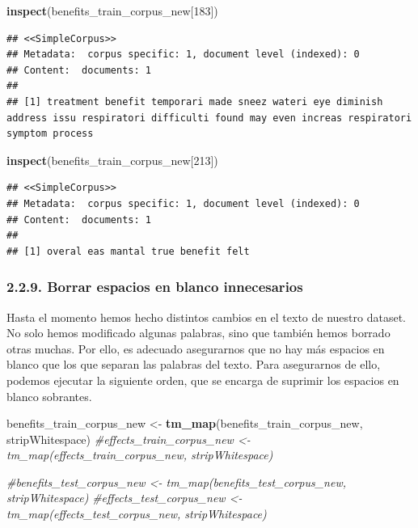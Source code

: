 \documentclass[spanish,]{article}
\newenvironment{Shaded}{\begin{snugshade}}{\end{snugshade}}
\newcommand{\KeywordTok}[1]{\textcolor[rgb]{0.13,0.29,0.53}{\textbf{#1}}}
\newcommand{\DecValTok}[1]{\textcolor[rgb]{0.00,0.00,0.81}{#1}}
\newcommand{\StringTok}[1]{\textcolor[rgb]{0.31,0.60,0.02}{#1}}
\newcommand{\CommentTok}[1]{\textcolor[rgb]{0.56,0.35,0.01}{\textit{#1}}}
\newcommand{\NormalTok}[1]{#1}
\begin{document}
\begin{Shaded}
\begin{Highlighting}[]
\KeywordTok{inspect}\NormalTok{(benefits_train_corpus_new[}\DecValTok{183}\NormalTok{])}
\end{Highlighting}
\end{Shaded}

\begin{verbatim}
## <<SimpleCorpus>>
## Metadata:  corpus specific: 1, document level (indexed): 0
## Content:  documents: 1
## 
## [1] treatment benefit temporari made sneez wateri eye diminish address issu respiratori difficulti found may even increas respiratori symptom process
\end{verbatim}

\begin{Shaded}
\begin{Highlighting}[]
\KeywordTok{inspect}\NormalTok{(benefits_train_corpus_new[}\DecValTok{213}\NormalTok{])}
\end{Highlighting}
\end{Shaded}

\begin{verbatim}
## <<SimpleCorpus>>
## Metadata:  corpus specific: 1, document level (indexed): 0
## Content:  documents: 1
## 
## [1] overal eas mantal true benefit felt
\end{verbatim}

\subsubsection{2.2.9. Borrar espacios en blanco
innecesarios}\label{borrar-espacios-en-blanco-innecesarios}

Hasta el momento hemos hecho distintos cambios en el texto de nuestro
dataset. No solo hemos modificado algunas palabras, sino que también
hemos borrado otras muchas. Por ello, es adecuado asegurarnos que no hay
más espacios en blanco que los que separan las palabras del texto. Para
asegurarnos de ello, podemos ejecutar la siguiente orden, que se encarga
de suprimir los espacios en blanco sobrantes.

\begin{Shaded}
\begin{Highlighting}[]
\NormalTok{benefits_train_corpus_new <-}\StringTok{ }\KeywordTok{tm_map}\NormalTok{(benefits_train_corpus_new, stripWhitespace) }
\CommentTok{#effects_train_corpus_new <- tm_map(effects_train_corpus_new, stripWhitespace) }

\CommentTok{#benefits_test_corpus_new <- tm_map(benefits_test_corpus_new, stripWhitespace) }
\CommentTok{#effects_test_corpus_new <- tm_map(effects_test_corpus_new, stripWhitespace) }
\end{Highlighting}
\end{Shaded}
\end{document}
